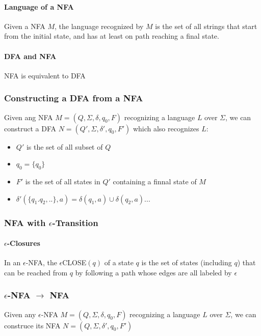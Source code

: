 \documentclass[titlepage]{article}
\begin{document}
            \paragraph{Language of a NFA}
            Given a NFA $M$, the language recognized by $M$ is the set of all strings that start from the initial state, and has at least on path reaching a final state.
            \paragraph{DFA and NFA}
            NFA is equivalent to DFA
        \subsubsection*{Constructing a DFA from a NFA}
        Given ang NFA $M=(Q,\Sigma,\delta,q_0,F)$ recognizing a language $L$ over $\Sigma$, we can construct a DFA $N=(Q',\Sigma,\delta',q_0,F')$ which also recognizes $L$:
        \begin{itemize}
            \item $Q'$ is the set of all subset of $Q$
            \item $q_0=\{q_0\}$
            \item $F'$ is the set of all states in $Q'$ containing a finnal state of $M$
            \item $\delta'(\{q_1.q_2,..\},a)=\delta(q_1,a)\cup\delta(q_2,a)...$
        \end{itemize}
        \subsubsection*{NFA with $\epsilon$-Transition}
        \paragraph{$\epsilon$-Closures}
        In an $\epsilon$-NFA, the $\epsilon$CLOSE$(q)$ of a state $q$ is the set of states (including $q$) that can be reached from $q$ by following a path whose edges are all labeled by $\epsilon$
        \subsubsection*{$\epsilon$-NFA $\rightarrow$ NFA}
        Given any $\epsilon$-NFA $M=(Q,\Sigma,\delta,q_0,F)$ recognizing a language $L$ over $\Sigma$, we can construce its NFA $N=(Q,\Sigma,\delta',q_0,F')$
\end{document}
